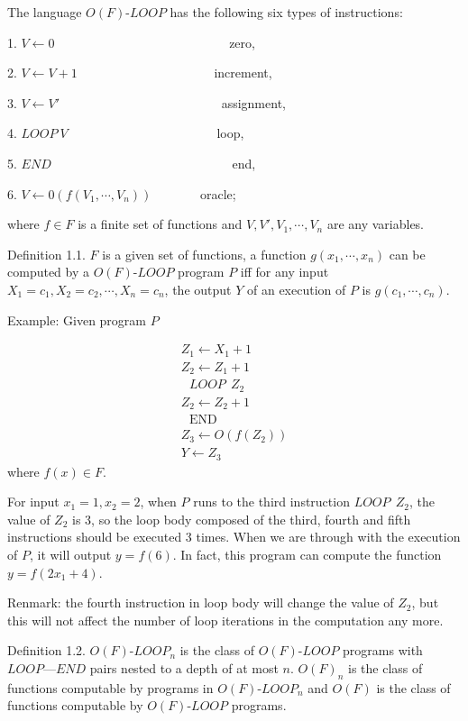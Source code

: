 The language $O(F)$-$LOOP$ has the following six types of
instructions:


1. $V\gets 0$ \ \ \ \ \ \ \ \ \ \ \ \ \ \ \ \ \ \ \ \ \ \ \ \ \ \ \ zero,

2. $V\gets V+1$ \ \ \ \ \ \ \ \ \ \ \ \ \ \ \ \ \ \ \ \ \ increment,

3. $V\gets V'$ \ \ \ \ \ \ \ \ \ \ \ \ \ \ \ \ \ \ \ \ \ \ \ \ \ assignment,

4. $LOOP \ V$ \ \ \ \ \ \ \ \ \ \ \ \ \ \ \ \ \ \ \ \ \ \ \ loop,

5. $END$ \ \ \ \ \ \ \ \ \ \ \ \ \ \ \ \ \ \ \ \ \ \ \ \ \ \ \ \ end,

6. $V\gets 0(f(V_1,\cdots,V_n))$ \ \ \ \ \ \ \ oracle;

\noindent
where $f\in F$ is a finite set of functions and
$V,V',V_1,\cdots,V_n$ are any variables.

Definition 1.1. $F$ is a given set of functions, a function
$g(x_1,\cdots,x_n)$ can be computed by a $O(F)$-$LOOP$ program $P$
iff for any input $X_1=c_1,X_2=c_2,\cdots,X_n=c_n$, the output 
$Y$ of an execution of $P$ is $g(c_1,\cdots,c_n)$.

Example: Given program $P$

$$\begin{array}{ll}
Z_1\longleftarrow X_1+1\\
Z_2\longleftarrow Z_1+1\\
\ \ \ LOOP\ \ Z_2\\
Z_2\longleftarrow Z_2+1\\
\ \ \ \mbox{END}\\
Z_3\longleftarrow O(f(Z_2))\\
Y\longleftarrow Z_3\end{array}$$
where $f(x)\in F$.

For input $x_1=1,x_2=2$, when $P$ runs to the third instruction
$LOOP\ \  Z_2$, the value of $Z_2$ is 3, so the loop body composed of
the third, fourth and fifth instructions should be executed 3 times. When
we are through with the execution of $P$, it will output 
$y=f(6)$. In fact, this program can compute the function
$y=f(2x_1+4)$.

Renmark: the fourth instruction in loop body will change the
value of $Z_2$, but this will not affect the number of loop 
iterations in the computation any more.

Definition 1.2. $O(F)$-$LOOP_n$ is the class of $O(F)$-$LOOP$
programs with $LOOP$---$END$ pairs nested to a depth of at most $n$.
$O(F)_n$ is the class of functions computable by programs in
$O(F)$-$LOOP_n$ and $O(F)$ is the class of functions computable by
$O(F)$-$LOOP$ programs.

